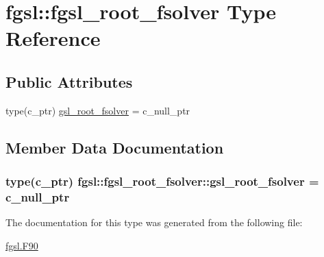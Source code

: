 \hypertarget{structfgsl_1_1fgsl__root__fsolver}{\section{fgsl\-:\-:fgsl\-\_\-root\-\_\-fsolver Type Reference}
\label{structfgsl_1_1fgsl__root__fsolver}
}
\subsection*{Public Attributes}
\begin{DoxyCompactItemize}
\item 
type(c\-\_\-ptr) \hyperlink{structfgsl_1_1fgsl__root__fsolver_a04d9a849618a8431b1b923968121a023}{gsl\-\_\-root\-\_\-fsolver} = c\-\_\-null\-\_\-ptr
\end{DoxyCompactItemize}


\subsection{Member Data Documentation}
\hypertarget{structfgsl_1_1fgsl__root__fsolver_a04d9a849618a8431b1b923968121a023}{
\subsubsection[{gsl\-\_\-root\-\_\-fsolver}]{\setlength{\rightskip}{0pt plus 5cm}type(c\-\_\-ptr) fgsl\-::fgsl\-\_\-root\-\_\-fsolver\-::gsl\-\_\-root\-\_\-fsolver = c\-\_\-null\-\_\-ptr}}\label{structfgsl_1_1fgsl__root__fsolver_a04d9a849618a8431b1b923968121a023}


The documentation for this type was generated from the following file\-:\begin{DoxyCompactItemize}
\item 
\hyperlink{fgsl_8F90}{fgsl.\-F90}\end{DoxyCompactItemize}
